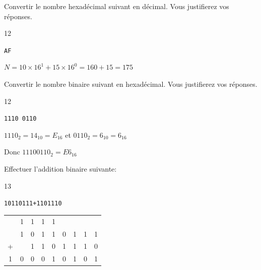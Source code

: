 \documentclass[a4paper,10pt]{report}
\def\ptsexoD{1}
\def\ptsexoE{1}
\def\ptsexoF{1}
\begin{document}
\medskip


\begin{minipage}{0.49\linewidth}
 \exods{\ptsexoD}

   Convertir le nombre hexadécimal suivant en décimal. Vous justifierez vos réponses.

\begin{answer}{1}{2} 
    \begin{center}
        \verb|AF|
    \end{center}   

    $N = 10\times16^1 + 15\times16^0 = 160 + 15 = 175$

\end{answer}
\end{minipage}\hfill
\begin{minipage}{0.49\linewidth}
     \exods{\ptsexoE}

Convertir le nombre binaire suivant en hexadécimal. Vous justifierez vos réponses.
\begin{answer}{1}{2} 
    \begin{center}
        \verb|1110 0110|
    \end{center}   

    $1110_2 = 14_{10} = E_{16}$ et $0110_2 = 6_{10} = 6_{16}$

    Donc $11100110_2 = E6_{16}$
\end{answer}
\end{minipage}

\medskip

\exods{\ptsexoF}

Effectuer l'addition binaire suivante:



    \begin{answer}{1}{3} \begin{center}
        \verb|10110111+1101110|

        \medskip

        \begin{tabular}{c@{}c@{}c@{}c@{}c@{}c@{}c@{}c@{}c}
          & 1 & 1 & 1 & 1 &   &   &   &   \\
          & 1 & 0 & 1 & 1 & 0 & 1 & 1 & 1 \\
        + &   & 1 & 1 & 0 & 1 & 1 & 1 & 0 \\
        \hline
        1 & 0 & 0 & 0 & 1 & 0 & 1 & 0 & 1 \\
        \end{tabular}
\end{center}  


    \end{answer}
\end{document}
